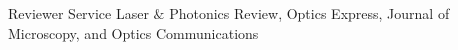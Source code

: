 \begin{rubric}{Reviewer Service}
    \entry* Laser $\&$ Photonics Review, Optics Express, Journal of Microscopy, and Optics Communications
\end{rubric}
